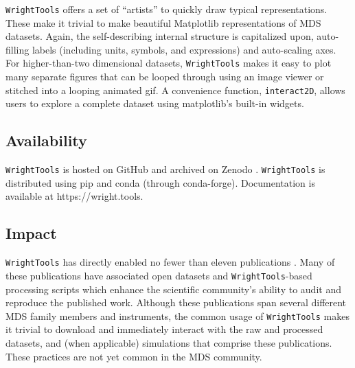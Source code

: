 \texttt{WrightTools} offers a set of ``artists'' to quickly draw typical
representations. These make it trivial to make beautiful Matplotlib
representations of MDS datasets. Again, the self-describing internal
structure is capitalized upon, auto-filling labels (including units,
symbols, and expressions) and auto-scaling axes. For higher-than-two
dimensional datasets, \texttt{WrightTools} makes it easy to plot many
separate figures that can be looped through using an image viewer or
stitched into a looping animated gif. A convenience function,
\texttt{interact2D}, allows users to explore a complete dataset using
matplotlib's built-in widgets.

\hypertarget{availability}{%
\subsection{Availability}\label{availability}}

\texttt{WrightTools} is hosted on
GitHub\cite{wrighttools-github} and archived
on Zenodo \cite{ThompsonBlaiseJonathan2018WrightTools}.
\texttt{WrightTools} is distributed using
pip\cite{wrighttools-pypi} and
conda\cite{wrighttools-conda} (through
conda-forge). Documentation is available at
https://wright.tools\cite{wrighttools-docs}.

\hypertarget{impact}{%
\subsection{Impact}\label{impact}}

\texttt{WrightTools} has directly enabled no fewer than eleven
publications \cite{CzechKyleJonathan2015a}\cite{KohlerDanielDavid2017a}
\cite{NeffMallonNathanA2017a}\cite{ChenJie2017a}
\cite{MorrowDarienJames2017a}\cite{HorakErikH2018a}
\cite{SundenKyleFoster2018a}\cite{KohlerDanielDavid2018a}
\cite{HandaliJonathanDaniel2018a}\cite{MorrowDarienJames2018a}
\cite{HandaliJonathanDaniel2018b}.
Many of these publications have
associated open datasets and \texttt{WrightTools}-based processing
scripts which enhance the scientific community's ability to audit and
reproduce the published work. Although these publications span several
different MDS family members and instruments, the common usage of
\texttt{WrightTools} makes it trivial to download and immediately
interact with the raw and processed datasets, and (when applicable)
simulations that comprise these publications. These practices are not
yet common in the MDS community.

